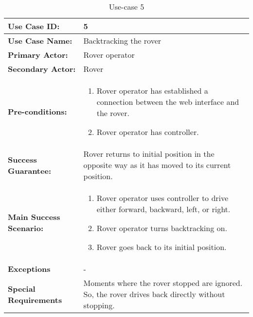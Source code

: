 \documentclass[12pt]{article}
\begin{document}
	 	\begin{table}[h]
	 		\centering
	 		\begin{tabularx}{\linewidth}{|X|X|}
	 			\hline
	 			\textbf{Use Case ID:} &5\\
	 			\hline
	 			\textbf{Use Case Name:} &Backtracking the rover\\
	 			\hline
	 			\textbf{Primary Actor:} &Rover operator\\
	 			\hline
	 			\textbf{Secondary Actor:} &Rover\\
	 			\hline
	 			\textbf{Pre-conditions:} &\begin{enumerate}
	 				\item Rover operator has established a connection between the web interface and the rover.
	 				\item Rover operator has controller.
	 			\end{enumerate}\\
	 			\hline
	 			\textbf{Success Guarantee:} &Rover returns to initial position in the opposite way as it has moved to its current position.\\
	 			\hline 
	 			\textbf{Main Success Scenario:} &\begin{enumerate}
	 				\item Rover operator uses controller to drive either forward, backward, left, or right.
	 				\item Rover operator turns backtracking on.
	 				\item Rover goes back to its initial position.
	 			\end{enumerate}\\
	 			\hline
	 			\textbf{Exceptions} &-\\
	 			\hline
	 			\textbf{Special Requirements} & Moments where the rover stopped are ignored. So, the rover drives back directly without stopping.\\
	 			\hline
	 		\end{tabularx}
	 		\caption{Use-case 5}
	 		\label{table:Use-case5}   
	 	\end{table}
\end{document}
